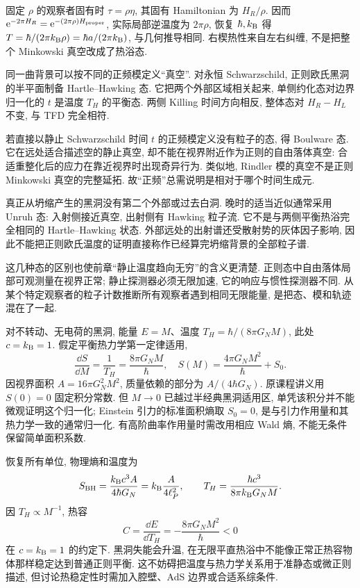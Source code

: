 固定 $\rho$ 的观察者固有时 $\tau=\rho\eta$, 其固有 Hamiltonian 为 $H_R/\rho$. 因而 $\mathrm e^{-2\pi H_R}=\mathrm e^{-(2\pi\rho)H_{\rm proper}}$, 实际局部逆温度为 $2\pi\rho$, 恢复 $\hbar,k_{\mathrm B}$ 得 $T=\hbar/(2\pi k_{\mathrm B}\rho)=\hbar a/(2\pi k_{\mathrm B})$, 与几何推导相同. 右楔热性来自左右纠缠, 不是把整个 Minkowski 真空改成了热浴态.

同一曲背景可以按不同的正频模定义“真空”. 对永恒 Schwarzschild, 正则欧氏黑洞的半平面制备 Hartle--Hawking 态. 它把两个外部区域相关起来, 单侧约化态对边界归一化的 $t$ 是温度 $T_H$ 的平衡态. 两侧 Killing 时间方向相反, 整体态对 $H_R-H_L$ 不变, 与 TFD 完全相符.

若直接以静止 Schwarzschild 时间 $t$ 的正频模定义没有粒子的态, 得 Boulware 态. 它在远处适合描述空的静止真空, 却不能在视界附近作为正则的自由落体真空: 合适重整化后的应力在靠近视界时出现奇异行为. 类似地, Rindler 模的真空不是正则 Minkowski 真空的完整延拓. 故“正频”总需说明是相对于哪个时间生成元.

真正从坍缩产生的黑洞没有第二个外部或过去白洞. 晚时的适当近似通常采用 Unruh 态: 入射侧接近真空, 出射侧有 Hawking 粒子流. 它不是与两侧平衡热浴完全相同的 Hartle--Hawking 状态. 外部远处的出射谱还受散射势的灰体因子影响, 因此不能把正则欧氏温度的证明直接称作已经算完坍缩背景的全部粒子谱.

这几种态的区别也使前章“静止温度趋向无穷”的含义更清楚. 正则态中自由落体局部可观测量在视界正常; 静止探测器必须无限加速, 它的响应与惯性探测器不同. 从某个特定观察者的粒子计数推断所有观察者遇到相同无限能量, 是把态、模和轨迹混在了一起.

对不转动、无电荷的黑洞, 能量 $E=M$、温度 $T_H=\hbar/(8\pi G_NM)$, 此处 $c=k_{\mathrm B}=1$. 假定平衡热力学第一定律适用,
\[
\frac{\dd S}{\dd M}=\frac1{T_H}
=\frac{8\pi G_NM}{\hbar},
\quad S(M)=\frac{4\pi G_NM^2}{\hbar}+S_0.
\]
因视界面积 $A=16\pi G_N^2M^2$, 质量依赖的部分为 $A/(4\hbar G_N)$. 原课程讲义用 $S(0)=0$ 固定积分常数. 但 $M\to0$ 已越过半经典黑洞适用区, 单凭该积分并不能微观证明这个归一化; Einstein 引力的标准面积熵取 $S_0=0$, 是与引力作用量和其热力学一致的通常归一化. 有高阶曲率作用量时需改用相应 Wald 熵, 不能无条件保留简单面积系数.

恢复所有单位, 物理熵和温度为
\[
S_{\rm BH}=\frac{k_{\mathrm B} c^3A}{4\hbar G_N}
=k_{\mathrm B}\frac{A}{4\ell_P^2},\qquad
T_H=\frac{\hbar c^3}{8\pi k_{\mathrm B} G_NM}.
\]
因 $T_H\propto M^{-1}$, 热容
\[
C=\frac{\dd E}{\dd T_H}=-\frac{8\pi G_NM^2}{\hbar}<0
\]
在 $c=k_{\mathrm B}=1$ 的约定下. 黑洞失能会升温, 在无限平直热浴中不能像正常正热容物体那样稳定达到普通正则平衡. 这不妨碍把温度与热力学关系用于准静态或微正则描述, 但讨论热稳定性时需加入腔壁、AdS 边界或合适系综条件.

